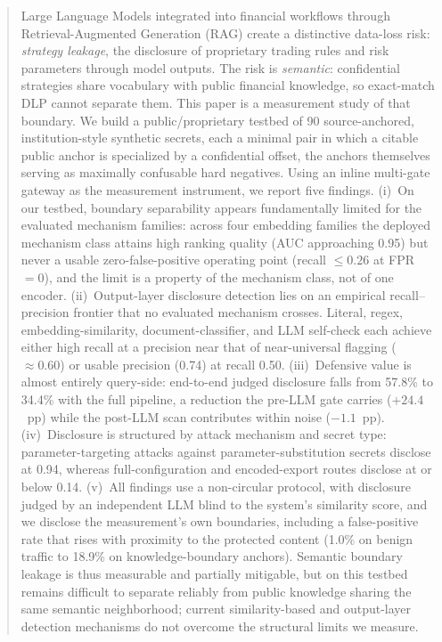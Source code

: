 \documentclass[journal]{IEEEtran}
\begin{document}
\begin{abstract}
Large Language Models integrated into financial workflows through
Retrieval-Augmented Generation (RAG) create a distinctive data-loss risk:
\textit{strategy leakage}, the disclosure of proprietary trading rules and risk
parameters through model outputs. The risk is \textit{semantic}: confidential
strategies share vocabulary with public financial knowledge, so exact-match DLP
cannot separate them. This paper is a measurement study of that boundary. We build a public/proprietary testbed of 90
source-anchored, institution-style synthetic secrets, each a minimal pair in which
a citable public anchor is specialized by a confidential offset, the anchors
themselves serving as maximally confusable hard negatives. Using an inline
multi-gate gateway as the measurement instrument, we report five findings.
(i)~On our testbed, boundary separability appears fundamentally
limited for the evaluated mechanism families: across four embedding families the
deployed mechanism class attains high ranking quality (AUC approaching 0.95) but
never a usable zero-false-positive operating point (recall $\le 0.26$ at
FPR${=}0$), and the limit is a property of the mechanism class, not of one
encoder. (ii)~Output-layer disclosure detection lies on an empirical
recall--precision frontier that no evaluated mechanism crosses. Literal, regex,
embedding-similarity, document-classifier, and LLM self-check each achieve
either high recall at a precision near that of near-universal flagging
($\approx 0.60$) or usable precision (0.74) at recall 0.50. (iii)~Defensive
value is almost entirely query-side: end-to-end judged disclosure falls from
57.8\% to 34.4\% with the full pipeline, a reduction the pre-LLM gate carries
($+24.4$~pp) while the post-LLM scan contributes within noise ($-1.1$~pp).
(iv)~Disclosure is structured by attack mechanism and secret type:
parameter-targeting attacks against parameter-substitution secrets disclose at
0.94, whereas full-configuration and encoded-export routes disclose at or below
0.14. (v)~All findings use a non-circular protocol, with disclosure judged by an
independent LLM blind to the system's similarity score, and we disclose the
measurement's own boundaries, including a false-positive rate that rises with
proximity to the protected content (1.0\% on benign traffic to 18.9\% on
knowledge-boundary anchors). Semantic boundary leakage is thus measurable and
partially mitigable, but on this testbed remains difficult to separate reliably
from public knowledge sharing the same semantic neighborhood; current
similarity-based and output-layer detection mechanisms do not overcome the
structural limits we measure.
\end{abstract}
\end{document}
